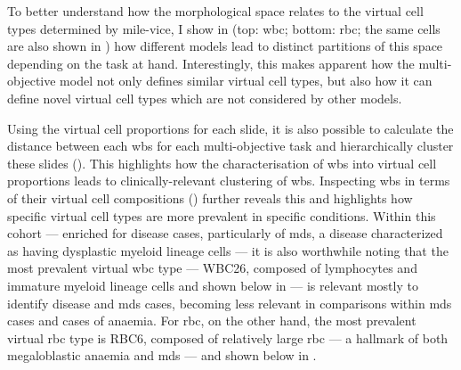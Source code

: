 To better understand how the morphological space relates to the virtual cell types determined by \ac{mile-vice}, I show in  (top: \ac{wbc}; bottom: \ac{rbc}; the same cells are also shown in ) how different models lead to distinct partitions of this space depending on the task at hand. Interestingly, this makes apparent how the multi-objective model not only defines similar virtual cell types, but also how it can define novel virtual cell types which are not considered by other models.

\begin{figure}[!ht]
    \label{fig:u-map-vc-cells}
\end{figure}

Using the virtual cell proportions for each slide, it is also possible to calculate the distance between each \ac{wbs} for each multi-objective task and hierarchically cluster these slides (). This highlights how the characterisation of \ac{wbs} into virtual cell proportions leads to clinically-relevant clustering of \ac{wbs}. Inspecting \ac{wbs} in terms of their virtual cell compositions () further reveals this and highlights how specific virtual cell types are more prevalent in specific conditions. Within this cohort --- enriched for disease cases, particularly of \ac{mds}, a disease characterized as having dysplastic myeloid lineage cells --- it is also worthwhile noting that the most prevalent virtual \ac{wbc} type --- WBC26, composed of lymphocytes and immature myeloid lineage cells and shown below in  --- is relevant mostly to identify disease and \ac{mds} cases, becoming less relevant in comparisons within \ac{mds} cases and cases of anaemia. For \ac{rbc}, on the other hand, the most prevalent virtual \ac{rbc} type is RBC6, composed of relatively large \ac{rbc} --- a hallmark of both megaloblastic anaemia and \ac{mds} --- and shown below in . 

\begin{figure}[!ht]
    \label{fig:heatmap-slides}
\end{figure}

